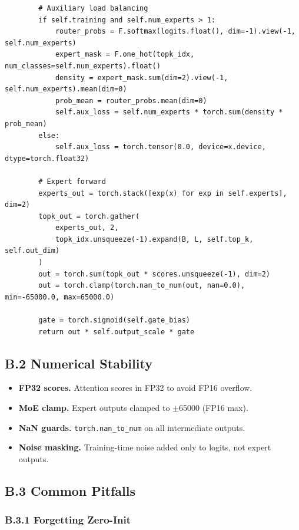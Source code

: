 \begin{lstlisting}
        # Auxiliary load balancing
        if self.training and self.num_experts > 1:
            router_probs = F.softmax(logits.float(), dim=-1).view(-1, self.num_experts)
            expert_mask = F.one_hot(topk_idx, num_classes=self.num_experts).float()
            density = expert_mask.sum(dim=2).view(-1, self.num_experts).mean(dim=0)
            prob_mean = router_probs.mean(dim=0)
            self.aux_loss = self.num_experts * torch.sum(density * prob_mean)
        else:
            self.aux_loss = torch.tensor(0.0, device=x.device, dtype=torch.float32)
        
        # Expert forward
        experts_out = torch.stack([exp(x) for exp in self.experts], dim=2)
        topk_out = torch.gather(
            experts_out, 2,
            topk_idx.unsqueeze(-1).expand(B, L, self.top_k, self.out_dim)
        )
        out = torch.sum(topk_out * scores.unsqueeze(-1), dim=2)
        out = torch.clamp(torch.nan_to_num(out, nan=0.0), min=-65000.0, max=65000.0)
        
        gate = torch.sigmoid(self.gate_bias)
        return out * self.output_scale * gate
\end{lstlisting}

\subsection{B.2 Numerical Stability}

\begin{itemize}
\item \textbf{FP32 scores.} Attention scores in FP32 to avoid FP16 overflow.
\item \textbf{MoE clamp.} Expert outputs clamped to $\pm$65000 (FP16 max).
\item \textbf{NaN guards.} \texttt{torch.nan\_to\_num} on all intermediate outputs.
\item \textbf{Noise masking.} Training-time noise added only to logits, not expert
  outputs.

\end{itemize}
\subsection{B.3 Common Pitfalls}

\subsubsection{B.3.1 Forgetting Zero-Init}


